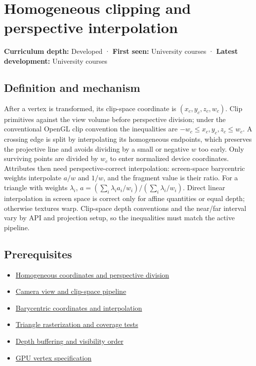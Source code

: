 \hypertarget{appendix-40426e4b2103}{}\label{referencestart:appendix-40426e4b2103}
\section{Homogeneous clipping and perspective interpolation}\label{appendix-40426e4b2103-homogeneous-clipping-and-perspective-interpolation}

\textbf{Curriculum depth:} Developed · \textbf{First seen:} University courses · \textbf{Latest development:} University courses

\subsection{Definition and mechanism}\label{appendix-40426e4b2103-definition-and-mechanism}

After a vertex is transformed, its clip-space coordinate is \((x_c,y_c,z_c,w_c)\). Clip primitives against the view volume before perspective division; under the conventional OpenGL clip convention the inequalities are \(-w_c\le x_c,y_c,z_c\le w_c\). A crossing edge is split by interpolating its homogeneous endpoints, which preserves the projective line and avoids dividing by a small or negative \(w\) too early. Only surviving points are divided by \(w_c\) to enter normalized device coordinates. Attributes then need perspective-correct interpolation: screen-space barycentric weights interpolate \(a/w\) and \(1/w\), and the fragment value is their ratio. For a triangle with weights \(\lambda_i\), \(a=(\sum_i\lambda_i a_i/w_i)/(\sum_i\lambda_i/w_i)\). Direct linear interpolation in screen space is correct only for affine quantities or equal depth; otherwise textures warp. Clip-space depth conventions and the near/far interval vary by API and projection setup, so the inequalities must match the active pipeline.

\subsection{Prerequisites}\label{appendix-40426e4b2103-prerequisites}

\begin{itemize}
\tightlist
\item
  \hyperref[appendix-cb3b26862282]{Homogeneous coordinates and perspective division}
\item
  \hyperref[appendix-1c07d64f5e70]{Camera view and clip-space pipeline}
\item
  \hyperref[appendix-02b9d9a81dca]{Barycentric coordinates and interpolation}
\item
  \hyperref[appendix-ed3f9bc298fe]{Triangle rasterization and coverage tests}
\item
  \hyperref[appendix-97578ed97952]{Depth buffering and visibility order}
\item
  \hyperref[appendix-749ba51a6c25]{GPU vertex specification}
\end{itemize}

